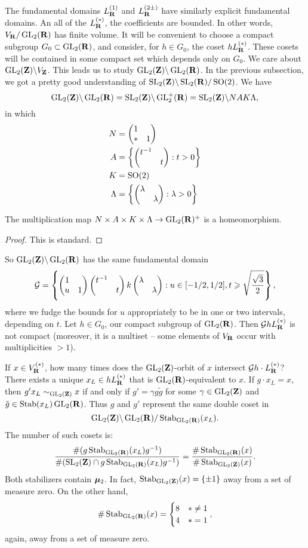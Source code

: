 The fundamental domains $L_{\mathbf{R}}^{(1)}$ and $L_{\mathbf{R}}^{(2\pm)}$ have similarly 
explicit fundamental domains. An all of the $L_{\mathbf{R}}^{(\ast)}$, the coefficients 
are bounded. In other words, 
$V_{\mathbf{R}}/\operatorname{GL}_2(\mathbf{R})$ has finite volume. It will be convenient to choose a compact 
subgroup $G_0\subset \operatorname{GL}_2(\mathbf{R})$, and consider, for $h\in G_0$, the coset 
$h L_{\mathbf{R}}^{(\ast)}$. These cosets will be contained in some compact set which 
depends only on $G_0$. We care about $\operatorname{GL}_2(\mathbf{Z})\backslash V_{\mathbf{Z}}$. This leads 
us to study $\operatorname{GL}_2(\mathbf{Z})\backslash \operatorname{GL}_2(\mathbf{R})$. In the previous subsection, we 
got a pretty good understanding of $\operatorname{SL}_2(\mathbf{Z})\backslash \operatorname{SL}_2(\mathbf{R})/\operatorname{SO}(2)$. 
We have 
\[
  \operatorname{GL}_2(\mathbf{Z})\backslash \operatorname{GL}_2(\mathbf{R}) = \operatorname{SL}_2(\mathbf{Z})\backslash \operatorname{GL}_2^+(\mathbf{R})  = \operatorname{SL}_2(\mathbf{Z})\backslash N A K \Lambda ,
\]
in which 
\begin{align*}
  N &= \begin{pmatrix} 1 &  \\ \ast & 1 \end{pmatrix} \\
  A &= \left\{\begin{pmatrix} t^{-1} &  \\  & t \end{pmatrix}:t>0\right\} \\
  K &= \operatorname{SO}(2) \\
  \Lambda &= \left\{\begin{pmatrix} \lambda &  \\  & \lambda \end{pmatrix}:\lambda>0\right\} 
\end{align*}

\begin{proposition}
The multiplication map $N\times A\times K\times \Lambda\to \operatorname{GL}_2(\mathbf{R})^+$ is 
a homeomorphism. 
\end{proposition}
\begin{proof}
This is standard. 
\end{proof}

So $\operatorname{GL}_2(\mathbf{Z})\backslash \operatorname{GL}_2(\mathbf{R})$ has the same fundamental domain 
\[
  \mathcal{G} = \left\{\begin{pmatrix} 1 &  \\ u & 1 \end{pmatrix} \begin{pmatrix} t^{-1} &  \\  & t \end{pmatrix}k \begin{pmatrix} \lambda &  \\  & \lambda \end{pmatrix}:u\in [-1/2,1/2],t\geqslant \sqrt{\frac{\sqrt 3}{2}}\right\} ,
\]
where we fudge the bounds for $u$ appropriately to be in one or two intervals, 
depending on $t$. Let $h\in G_0$, our compact subgroup of $\operatorname{GL}_2(\mathbf{R})$. Then 
$\mathcal{G} h L_{\mathbf{R}}^{(\ast)}$ is not compact (moreover, it is a multiset -- some 
elements of $V_{\mathbf{R}}$ occur with multiplicities $>1$). 

If $x\in V_{\mathbf{R}}^{(\ast)}$, how many times does the $\operatorname{GL}_2(\mathbf{Z})$-orbit of $x$ 
intersect $\mathcal{G} h \cdot L_{\mathbf{R}}^{(\ast)}$? There exists a unique 
$x_L\in h L_{\mathbf{R}}^{(\ast)}$ that is $\operatorname{GL}_2(\mathbf{R})$-equivalent to $x$. If 
$g\cdot x_L=x$, then $g' x_L\sim_{\operatorname{GL}_2(\mathbf{Z})} x$ if and only if 
$g' = \gamma g \tilde g$ for some $\gamma\in \operatorname{GL}_2(\mathbf{Z})$ and 
$\tilde g\in \operatorname{Stab}(x_L)\operatorname{GL}_2(\mathbf{R})$. Thus $g$ and $g'$ represent the same 
double coset in 
\[
  \operatorname{GL}_2(\mathbf{Z})\backslash \operatorname{GL}_2(\mathbf{R})/\operatorname{Stab}_{\operatorname{GL}_2(\mathbf{R})}(x_L) .
\]
The number of such cosets is: 
\[
  \frac{\#(g \operatorname{Stab}_{\operatorname{GL}_2(\mathbf{R})}(x_L)g^{-1})}{\#(\operatorname{SL}_2(\mathbf{Z})\cap g\operatorname{Stab}_{\operatorname{GL}_2(\mathbf{R})}(x_L)g^{-1})} = \frac{\#\operatorname{Stab}_{\operatorname{GL}_2(\mathbf{R})}(x)}{\#\operatorname{Stab}_{\operatorname{GL}_2(\mathbf{Z})}(x)} .
\]
Both stabilizers contain ${\bm\mu}_2$. In fact, 
$\operatorname{Stab}_{\operatorname{GL}_2(\mathbf{Z})}(x)=\{\pm 1\}$ away from a set of measure zero. On the 
other hand, 
\[
  \#\operatorname{Stab}_{\operatorname{GL}_2(\mathbf{R})}(x) = \begin{cases} 8 & \ast \ne 1 \\ 4 & \ast = 1 \end{cases} ,
\]
again, away from a set of measure zero. 

